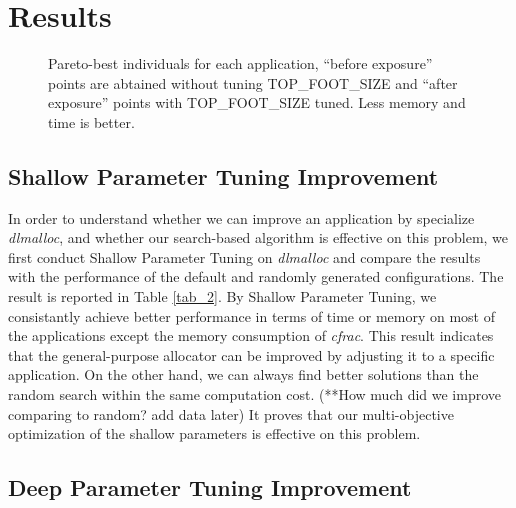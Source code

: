
\section{Results}

\begin{figure*}[htbp]
	\centering
	\caption{Pareto-best individuals for each application, ``before exposure'' points are abtained without tuning TOP\_FOOT\_SIZE and ``after exposure'' points with TOP\_FOOT\_SIZE tuned. Less memory and time is better.}\label{fig_10}
\end{figure*}

\subsection{Shallow Parameter Tuning Improvement}

In order to understand whether we can improve an application by specialize \emph{dlmalloc}, and whether our search-based algorithm is effective on this problem, we first conduct Shallow Parameter Tuning on \emph{dlmalloc} and compare the results with the performance of the default and randomly generated configurations. The result is reported in Table \ref{tab_2}. By Shallow Parameter Tuning, we consistantly achieve better performance in terms of time or memory on most of the applications except the memory consumption of \emph{cfrac}. This result indicates that the general-purpose allocator can be improved by adjusting it to a specific application. On the other hand, we can always find better solutions than the random search within the same computation cost. (**How much did we improve comparing to random? add data later) It proves that our multi-objective optimization of the shallow parameters is effective on this problem.

\subsection{Deep Parameter Tuning Improvement}

